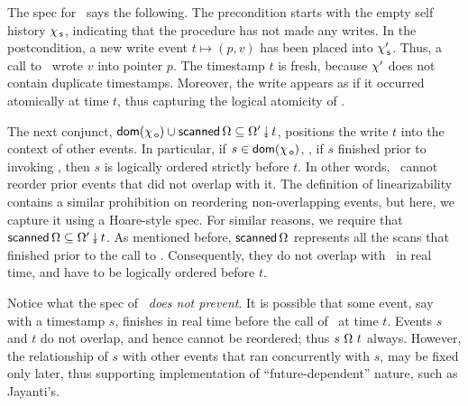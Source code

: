 
The spec for \jywrite\ says the following. The precondition starts
with the empty self history $\chi_{\, \mathsf{s}}$, indicating that the procedure
has not made any writes. In the postcondition, a new write event $t
\mapsto (p, v)$ has been placed into $\chi_{\, \mathsf{s}}'$. Thus, a call to
\jywrite\ wrote $v$ into pointer $p$. The timestamp $t$
is fresh, because $\chi'$ does not contain duplicate timestamps.
%
%
Moreover, the write appears as if it occurred atomically at time
$t$, thus capturing the logical atomicity of \jywrite.

The next conjunct, $\dom{\histO} \cup \scanned\stableorder \subseteq
\sideal{\stableorderP}{t}$, positions the write $t$ into the context
of other events. In particular, if $s \in \mathsf{dom}(\chi_{\, \mathsf{o}})$, \ie, if $s$
finished prior to invoking \jywrite, then $s$ is logically ordered
strictly before $t$. In other words, \jywrite\ cannot reorder prior
events that did not overlap with it. The definition of linearizability
contains a similar prohibition on reordering non-overlapping events,
but here, we capture it using a Hoare-style spec. For similar reasons,
we require that $\scanned\stableorder \subseteq
\sideal{\stableorderP}{t}$. As mentioned before,
$\mathsf{scanned}\,\Omega$ represents all the scans that finished prior to
the call to \jywrite. Consequently, they do not overlap with
\jywrite\ in real time, and have to be logically ordered before $t$.

Notice what the spec of \jywrite\ \emph{does not prevent}. It is
possible that some event, say with a timestamp $s$, finishes in real
time before the call of \jywrite~at time $t$. Events $s$ and $t$ do
not overlap, and hence cannot be reordered; thus
$s\ {\Omega}\ t$ always. However, the relationship of $s$ with
other events that ran concurrently with $s$, may be fixed only later,
thus supporting implementation of ``future-dependent'' nature, such as
Jayanti's.


